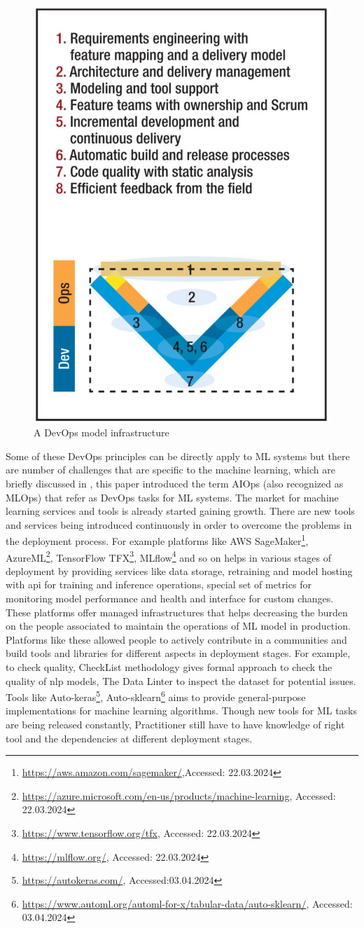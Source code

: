 \begin{figure}[!ht]
    \centering
    \includegraphics[width=0.45 \textwidth]{chapters/images/Literature_review/DevOps.JPG}
    \caption{A DevOps model infrastructure \cite{ebert2016devops}}
    \label{fig:DevOps}
\end{figure}

Some of these DevOps principles can be directly apply to ML systems but there are number of challenges that are specific to the machine learning, which are briefly discussed in \cite{dang2019aiops}, this paper introduced the term AIOps (also recognized as MLOps) that refer as DevOps tasks for ML systems. The market for machine learning services and tools is already started gaining growth. There are new tools and services being introduced continuously in order to overcome the problems in the deployment process. For example platforms like AWS SageMaker\footnote{\url{https://aws.amazon.com/sagemaker/},Accessed: 22.03.2024}, AzureML\footnote{\url{ https://azure.microsoft.com/en-us/products/machine-learning}, Accessed: 22.03.2024}, TensorFlow TFX\footnote{\url{https://www.tensorflow.org/tfx}, Accessed: 22.03.2024}, MLflow\footnote{\url{https://mlflow.org/}, Accessed: 22.03.2024} and so on helps in various stages of deployment by providing services like data storage, retraining and model hosting with \acrfull{api} for training and inference operations, special set of metrics for monitoring model performance and health and interface for custom changes. These platforms offer managed infrastructures that helps decreasing the burden on the people associated to maintain the operations of ML model in production. Platforms like these allowed people to actively contribute in a communities and build tools and libraries for different aspects in deployment stages. For example, to check quality, CheckList methodology \cite{ribeiro2020beyond} gives formal approach to check the quality of \acrshort{nlp} models, The Data Linter \cite{hynes2017data} to inspect the dataset for potential issues. Tools like Auto-keras\footnote{\url{https://autokeras.com/}, Accessed:03.04.2024}, Auto-sklearn\footnote{\url{https://www.automl.org/automl-for-x/tabular-data/auto-sklearn/}, Accessed: 03.04.2024} aims to provide general-purpose implementations for machine learning algorithms. Though new tools for ML tasks are being released constantly, Practitioner still have to have knowledge of right tool and the dependencies at different deployment stages.




